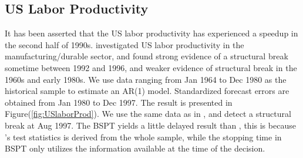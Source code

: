 \documentclass[preprint,authoryear,12pt,english]{elsarticle}
\theoremstyle{plain}
\begin{document}
\subsection{US Labor Productivity}
It has been asserted that the US labor productivity has experienced a speedup in the second half of 1990s. \cite{Hansen2001TheChange} investigated US labor productivity in the manufacturing/durable sector, and found strong evidence of a structural break sometime between 1992 and 1996, and weaker evidence of structural break in the 1960s and early 1980s. We use data ranging from Jan 1964 to Dec 1980 as the historical sample to estimate an AR(1) model. Standardized forecast errors are obtained from Jan 1980 to Dec 1997. The result is presented in Figure(\ref{fig:USlaborProd}). We use the same data as in \cite{Hansen2001TheChange}, and detect a structural break at Aug 1997. The BSPT yields a little delayed result than \cite{Hansen2001TheChange}, this is because \cite{Hansen2001TheChange}'s test statistics is derived from the whole sample, while the stopping time in BSPT only utilizes the information available at the time of the decision.
\end{document}
